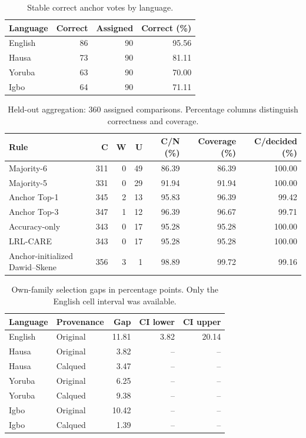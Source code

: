\begin{table}[htbp]
\centering
\caption{Stable correct anchor votes by language.}
\small
\begin{tabular}{lrrr}
\toprule
Language & Correct & Assigned & Correct (\%) \\
\midrule
English & 86 & 90 & 95.56 \\
Hausa & 73 & 90 & 81.11 \\
Yoruba & 63 & 90 & 70.00 \\
Igbo & 64 & 90 & 71.11 \\
\bottomrule
\end{tabular}
\end{table}
\begin{table}[htbp]
\centering
\caption{Held-out aggregation: 360 assigned comparisons. Percentage columns distinguish correctness and coverage.}
\small
\begin{tabular}{lrrrrrr}
\toprule
Rule & C & W & U & C/N (\%) & Coverage (\%) & C/decided (\%) \\
\midrule
Majority-6 & 311 & 0 & 49 & 86.39 & 86.39 & 100.00 \\
Majority-5 & 331 & 0 & 29 & 91.94 & 91.94 & 100.00 \\
Anchor Top-1 & 345 & 2 & 13 & 95.83 & 96.39 & 99.42 \\
Anchor Top-3 & 347 & 1 & 12 & 96.39 & 96.67 & 99.71 \\
Accuracy-only & 343 & 0 & 17 & 95.28 & 95.28 & 100.00 \\
LRL-CARE & 343 & 0 & 17 & 95.28 & 95.28 & 100.00 \\
Anchor-initialized Dawid--Skene & 356 & 3 & 1 & 98.89 & 99.72 & 99.16 \\
\bottomrule
\end{tabular}
\end{table}
\begin{table}[htbp]
\centering
\caption{Own-family selection gaps in percentage points. Only the English cell interval was available.}
\small
\begin{tabular}{llrrr}
\toprule
Language & Provenance & Gap & CI lower & CI upper \\
\midrule
English & Original & 11.81 & 3.82 & 20.14 \\
Hausa & Original & 3.82 & -- & -- \\
Hausa & Calqued & 3.47 & -- & -- \\
Yoruba & Original & 6.25 & -- & -- \\
Yoruba & Calqued & 9.38 & -- & -- \\
Igbo & Original & 10.42 & -- & -- \\
Igbo & Calqued & 1.39 & -- & -- \\
\bottomrule
\end{tabular}
\end{table}
